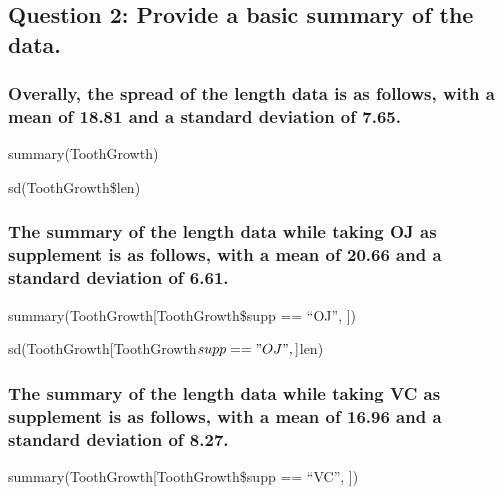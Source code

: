 \documentclass[
]{article}
\begin{document}
\hypertarget{question-2-provide-a-basic-summary-of-the-data.}{%
\subsection{Question 2: Provide a basic summary of the
data.}\label{question-2-provide-a-basic-summary-of-the-data.}}

\hypertarget{overally-the-spread-of-the-length-data-is-as-follows-with-a-mean-of-18.81-and-a-standard-deviation-of-7.65.}{%
\subsubsection{Overally, the spread of the length data is as follows,
with a mean of 18.81 and a standard deviation of
7.65.}\label{overally-the-spread-of-the-length-data-is-as-follows-with-a-mean-of-18.81-and-a-standard-deviation-of-7.65.}}

summary(ToothGrowth)

sd(ToothGrowth\$len)

\hypertarget{the-summary-of-the-length-data-while-taking-oj-as-supplement-is-as-follows-with-a-mean-of-20.66-and-a-standard-deviation-of-6.61.}{%
\subsubsection{The summary of the length data while taking OJ as
supplement is as follows, with a mean of 20.66 and a standard deviation
of
6.61.}\label{the-summary-of-the-length-data-while-taking-oj-as-supplement-is-as-follows-with-a-mean-of-20.66-and-a-standard-deviation-of-6.61.}}

summary(ToothGrowth{[}ToothGrowth\$supp == ``OJ'', {]})

sd(ToothGrowth{[}ToothGrowth\(supp == "OJ", ]\)len)

\hypertarget{the-summary-of-the-length-data-while-taking-vc-as-supplement-is-as-follows-with-a-mean-of-16.96-and-a-standard-deviation-of-8.27.}{%
\subsubsection{The summary of the length data while taking VC as
supplement is as follows, with a mean of 16.96 and a standard deviation
of
8.27.}\label{the-summary-of-the-length-data-while-taking-vc-as-supplement-is-as-follows-with-a-mean-of-16.96-and-a-standard-deviation-of-8.27.}}

summary(ToothGrowth{[}ToothGrowth\$supp == ``VC'', {]})
\end{document}

